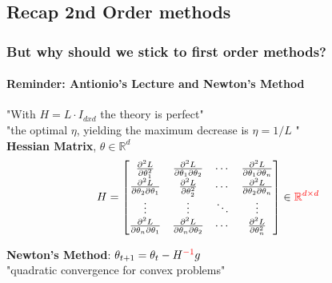 \documentclass[
	11pt, %
	aspectratio=169, %
]{beamer}
\begin{document}
\subsection{Recap 2nd Order methods}
\begin{frame}
	\frametitle{But why should we stick to first order methods?}
	\framesubtitle{Reminder: Antionio's Lecture and Newton's Method}
		"With $H= L \cdot I_{dxd}$ the theory is perfect" \\
		"the optimal $\eta$, yielding the maximum decrease is $\eta = 1/L$ "\\
		\vspace{1em}
		\textbf{{Hessian Matrix}}, $\theta \in \mathbb{R}^d$
\[
H = \begin{bmatrix}
\frac{\partial^2 L}{\partial \theta_1^2} & \frac{\partial^2 L}{\partial \theta_1 \partial \theta_2} & \cdots & \frac{\partial^2 L}{\partial \theta_1 \partial \theta_n} \\
\frac{\partial^2 L}{\partial \theta_2 \partial \theta_1} & \frac{\partial^2 L}{\partial \theta_2^2} & \cdots & \frac{\partial^2 L}{\partial \theta_2 \partial \theta_n} \\
\vdots & \vdots & \ddots & \vdots \\
\frac{\partial^2 L}{\partial \theta_n \partial \theta_1} & \frac{\partial^2 L}{\partial \theta_n \partial \theta_2} & \cdots & \frac{\partial^2 L}{\partial \theta_n^2}
\end{bmatrix} \in \textcolor{red}{\mathbb{R}^{d\times d}}
\]

		\textbf{Newton's Method}: $\theta_{t+1} = \theta_t - H^{\textcolor{red}{-1}} g$\\
		"quadratic convergence for convex problems"

\end{frame}
\end{document}
